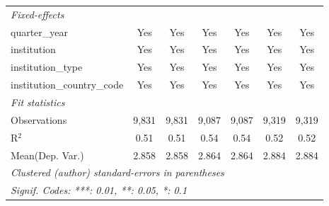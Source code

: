 \begin{tabular}{lcccccc}
   \midrule
   \emph{Fixed-effects}\\
   quarter\_year                      & Yes     & Yes          & Yes         & Yes          & Yes     & Yes\\  
   institution                        & Yes     & Yes          & Yes         & Yes          & Yes     & Yes\\  
   institution\_type                  & Yes     & Yes          & Yes         & Yes          & Yes     & Yes\\  
   institution\_country\_code         & Yes     & Yes          & Yes         & Yes          & Yes     & Yes\\  
   \midrule
   \emph{Fit statistics}\\
   Observations                       & 9,831   & 9,831        & 9,087       & 9,087        & 9,319   & 9,319\\  
   R$^2$                              & 0.51    & 0.51         & 0.54        & 0.54         & 0.52    & 0.52\\  
Mean(Dep. Var.) & 2.858 & 2.858 & 2.864 & 2.864 & 2.884 & 2.884 \\
   \midrule \midrule
   \multicolumn{7}{l}{\emph{Clustered (author) standard-errors in parentheses}}\\
   \multicolumn{7}{l}{\emph{Signif. Codes: ***: 0.01, **: 0.05, *: 0.1}}\\
\end{tabular}
\par\endgroup
